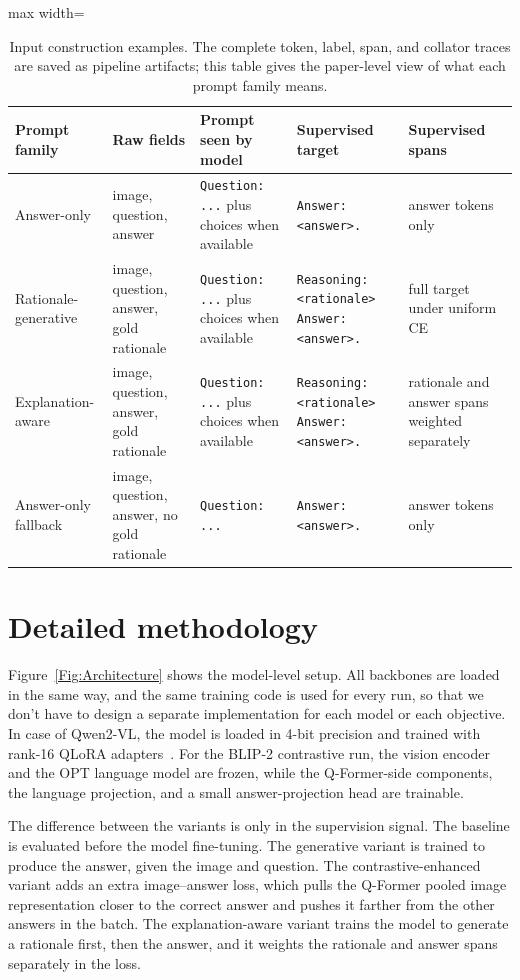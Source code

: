 \documentclass[12pt,bibliography=totoc,listof=totoc,BCOR=5mm,DIV=12,oneside,open=any]{scrbook}
\let\cite\citep
\begin{document}
\begin{table}[!ht]
\centering
\caption{Input construction examples. The complete token, label, span, and collator traces are saved as pipeline artifacts; this table gives the paper-level view of what each prompt family means.}
\label{tab:InputConstruction}
\scriptsize
\begin{adjustbox}{max width=\textwidth}
\begin{tabular}{|p{2.5cm}|p{3.6cm}|p{4.5cm}|p{4.5cm}|p{2.8cm}|}
\hline
\textbf{Prompt family} & \textbf{Raw fields} & \textbf{Prompt seen by model} & \textbf{Supervised target} & \textbf{Supervised spans} \\ \hline
Answer-only & image, question, answer & \texttt{Question: ...} plus choices when available & \texttt{Answer: <answer>.} & answer tokens only \\
Rationale-generative & image, question, answer, gold rationale & \texttt{Question: ...} plus choices when available & \texttt{Reasoning: <rationale> Answer: <answer>.} & full target under uniform CE \\
Explanation-aware & image, question, answer, gold rationale & \texttt{Question: ...} plus choices when available & \texttt{Reasoning: <rationale> Answer: <answer>.} & rationale and answer spans weighted separately \\
Answer-only fallback & image, question, answer, no gold rationale & \texttt{Question: ...} & \texttt{Answer: <answer>.} & answer tokens only \\ \hline
\end{tabular}
\end{adjustbox}
\end{table}

\section{Detailed methodology}
Figure~\ref{Fig:Architecture} shows the model-level setup.
All backbones are loaded in the same way, and the same training code is used for every run,
so that we don't have to design a separate implementation for each model or each objective.
In case of Qwen2-VL, the model is loaded in 4-bit precision and trained with rank-16 QLoRA adapters~\cite{hu2022lora,dettmers2023qlora}.
For the BLIP-2 contrastive run, the vision encoder and the OPT language model are frozen,
while the Q-Former-side components, the language projection, and a small answer-projection head are trainable.

The difference between the variants is only in the supervision signal.
The baseline is evaluated before the model fine-tuning.
The generative variant is trained to produce the answer, given the image and question.
The contrastive-enhanced variant adds an extra image--answer loss, which pulls the Q-Former pooled image representation
closer to the correct answer and pushes it farther from the other answers in the batch.
The explanation-aware variant trains the model to generate a rationale first, then the answer, and it weights the rationale and answer spans separately in the loss.
\end{document}
